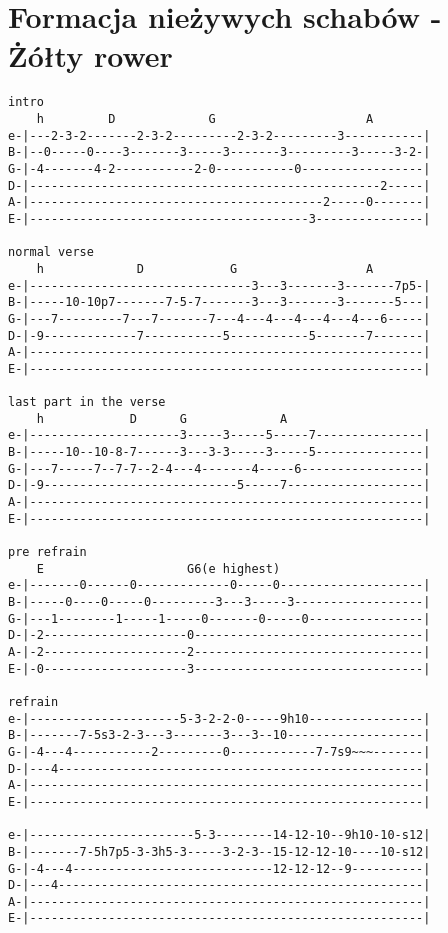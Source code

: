 \section{Formacja nieżywych schabów - Żółty rower}
\begin{verbatim}
intro
    h         D             G                     A
e-|---2-3-2-------2-3-2---------2-3-2---------3-----------|
B-|--0-----0----3-------3-----3-------3---------3-----3-2-|
G-|-4-------4-2-----------2-0-----------0-----------------|
D-|-------------------------------------------------2-----|
A-|-----------------------------------------2-----0-------|
E-|---------------------------------------3---------------|

normal verse
    h             D            G                  A
e-|-------------------------------3---3-------3-------7p5-|
B-|-----10-10p7-------7-5-7-------3---3-------3-------5---|
G-|---7---------7---7-------7---4---4---4---4---4---6-----|
D-|-9-------------7-----------5-----------5-------7-------|
A-|-------------------------------------------------------|
E-|-------------------------------------------------------|

last part in the verse
    h            D      G             A      
e-|---------------------3-----3-----5-----7---------------|
B-|-----10--10-8-7------3---3-3-----3-----5---------------|
G-|---7-----7--7-7--2-4---4-------4-----6-----------------|
D-|-9---------------------------5-----7-------------------|
A-|-------------------------------------------------------|
E-|-------------------------------------------------------|

pre refrain
    E                    G6(e highest)
e-|-------0------0-------------0-----0--------------------|
B-|-----0----0-----0---------3---3-----3------------------|
G-|---1--------1-----1-----0-------0-----0----------------|
D-|-2--------------------0--------------------------------|
A-|-2--------------------2--------------------------------|
E-|-0--------------------3--------------------------------|

refrain
e-|---------------------5-3-2-2-0-----9h10----------------|
B-|-------7-5s3-2-3---3-------3---3--10-------------------|
G-|-4---4-----------2---------0------------7-7s9~~~-------|
D-|---4---------------------------------------------------|
A-|-------------------------------------------------------|
E-|-------------------------------------------------------|

e-|-----------------------5-3--------14-12-10--9h10-10-s12|
B-|-------7-5h7p5-3-3h5-3-----3-2-3--15-12-12-10----10-s12|
G-|-4---4----------------------------12-12-12--9----------|
D-|---4---------------------------------------------------|
A-|-------------------------------------------------------|
E-|-------------------------------------------------------|



\end{verbatim}
